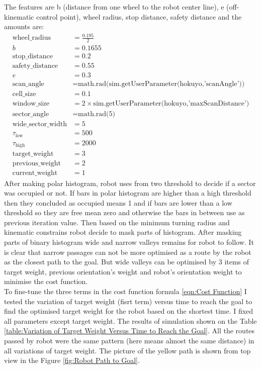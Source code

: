 \noindent The features are b (distance from one wheel to the robot center line), e (off-kinematic control point), wheel radius, stop distance, safety distance and the amounts are: \\
\begin{align*}
\text{wheel\_radius} &= \frac{0.195}{2} \\
b &= 0.1655 \\
\text{stop\_distance} &= 0.2 \\
\text{safety\_distance} &= 0.55 \\
e &= 0.3\\
\text{scan\_angle} &= \text{math.rad(sim.getUserParameter(hokuyo,'scanAngle'))} \\
\text{cell\_size} &= 0.1 \\
\text{window\_size} &= 2 \times \text{sim.getUserParameter(hokuyo,'maxScanDistance')} \\
\text{sector\_angle} &= \text{math.rad(5)} \\
\text{wide\_sector\_width} &= 5 \\
\tau_{\text{low}} &= 500 \\
\tau_{\text{high}} &= 2000 \\
\text{target\_weight} &= 3 \\
\text{previous\_weight} &= 2 \\
\text{current\_weight} &= 1
\end{align*}
\noindent After making polar histogram, robot uses from two threshold to decide if a sector was occupied or not. If bars in polar histogram are higher than a high threshold then they concluded as occupied means 1  and if bars are lower than a low threshold so they are free mean zero and otherwise the bars in between use as previous iteration value. Then based on the minimum turning radius and kinematic constrains robot decide to mask parts of histogram. After masking parts of binary histogram wide and narrow valleys remains for robot to follow. It is clear that narrow passages can not be more optimised as a route by the robot as the closest path to the goal. But wide valleys can be optimised by 3 items of target weight, previous orientation's weight and robot's orientation weight to minimise the cost function. \\
\noindent To fine-tune the three terms in the cost function formula \eqref{eqn:Cost Function} I tested the variation of target weight (fisrt term) versus time to reach the goal to find the optimised target weight for the robot based on the shortest time. I fixed all parameters except target weight. The results of simulation shown on the Table \ref{table:Variation of Target Weight Versus Time to Reach the Goal}. All the routes passed by robot were the same pattern (here means almost the same distance) in all variations of target weight. The picture of the yellow path is shown from top view in the Figure \ref{fig:Robot Path to Goal}. 

